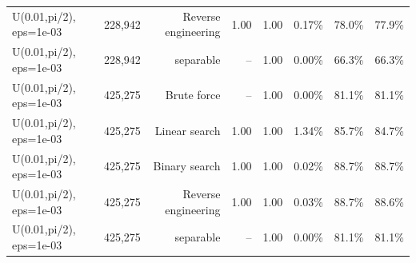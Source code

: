 \begin{tabular}{llrrrrrr}
U(0.01,pi/2), eps=1e-03 & 228,942 & Reverse engineering & 1.00 & 1.00 & 0.17\% & 78.0\% & 77.9\% \\
U(0.01,pi/2), eps=1e-03 & 228,942 & separable & -- & 1.00 & 0.00\% & 66.3\% & 66.3\% \\
U(0.01,pi/2), eps=1e-03 & 425,275 & Brute force & -- & 1.00 & 0.00\% & 81.1\% & 81.1\% \\
U(0.01,pi/2), eps=1e-03 & 425,275 & Linear search & 1.00 & 1.00 & 1.34\% & 85.7\% & 84.7\% \\
U(0.01,pi/2), eps=1e-03 & 425,275 & Binary search & 1.00 & 1.00 & 0.02\% & 88.7\% & 88.7\% \\
U(0.01,pi/2), eps=1e-03 & 425,275 & Reverse engineering & 1.00 & 1.00 & 0.03\% & 88.7\% & 88.6\% \\
U(0.01,pi/2), eps=1e-03 & 425,275 & separable & -- & 1.00 & 0.00\% & 81.1\% & 81.1\% \\
\bottomrule
\end{tabular}
